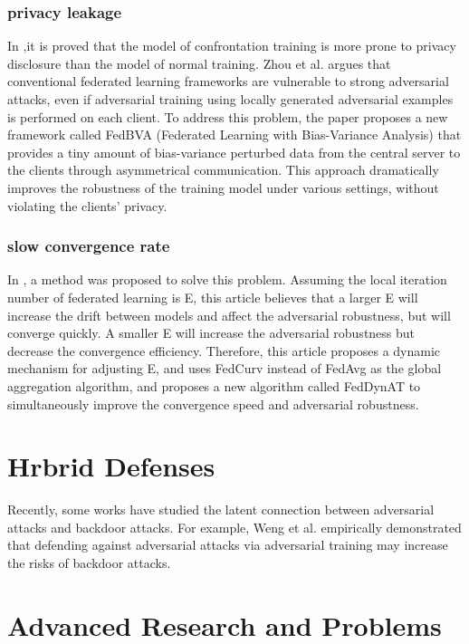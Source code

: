 \documentclass[conference]{IEEEtran}
\begin{document}
\subsubsection{privacy leakage}  
In \cite{b106},it is proved that the model of confrontation training is more prone to 
privacy disclosure than the model of normal training.
Zhou et al.\cite{103} argues that conventional federated learning frameworks are vulnerable
to strong adversarial attacks, even if adversarial training using locally
generated adversarial examples is performed on each client. To address this
problem, the paper proposes a new framework called FedBVA (Federated Learning
with Bias-Variance Analysis) that provides a tiny amount of bias-variance
perturbed data from the central server to the clients through asymmetrical
communication. This approach dramatically improves the robustness of the
training model under various settings, without violating the clients' privacy.  

\subsubsection{slow convergence rate} 
In \cite{b107}, a method was proposed to solve this problem.
Assuming the local iteration number of federated learning is E, this article believes that a larger E will 
increase the drift between models and affect the adversarial robustness, but will converge quickly. A smaller 
E will increase the adversarial robustness but decrease the convergence efficiency. Therefore, this article 
proposes a dynamic mechanism for adjusting E, and uses FedCurv instead of FedAvg as the global aggregation 
algorithm, and proposes a new algorithm called FedDynAT to simultaneously improve the convergence 
speed and adversarial robustness.

\section{Hrbrid Defenses}

Recently, some works have studied the latent connection between adversarial attacks and backdoor attacks.
For example, Weng et al. \cite{b66}empirically demonstrated that defending
against adversarial attacks via adversarial training may increase the risks of backdoor attacks.


\section{Advanced Research and Problems}
\end{document}
